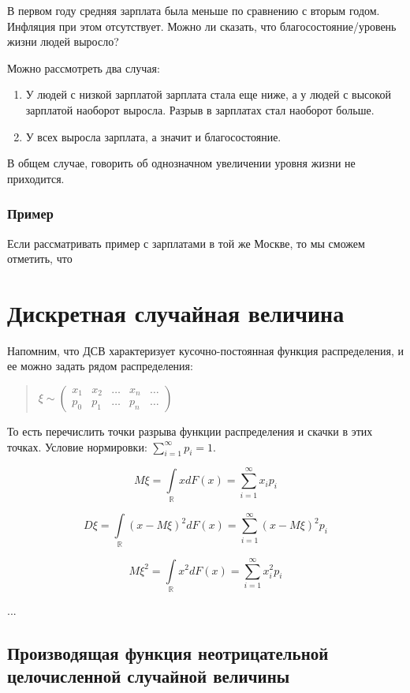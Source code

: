 \documentclass{article}
\begin{document}
В первом году средняя зарплата была меньше по сравнению с вторым годом. Инфляция при этом отсутствует. Можно ли сказать, что благосостояние/уровень жизни людей выросло?

Можно рассмотреть два случая:

\begin{enumerate}
\item У людей с низкой зарплатой зарплата стала еще ниже, а у людей с высокой зарплатой наоборот выросла. Разрыв в зарплатах стал наоборот больше.
\item У всех выросла зарплата, а значит и благосостояние.
\end{enumerate}

В общем случае, говорить об однозначном увеличении уровня жизни не приходится.

\subsubsection{Пример}

Если рассматривать пример с зарплатами в той же Москве, то мы сможем отметить, что 

\section{Дискретная случайная величина}

Напомним, что ДСВ характеризует кусочно-постоянная функция распределения, и ее можно задать рядом распределения:


\begin{quote}
$\xi \sim
\begin{pmatrix}
x_1 & x_2 & \ldots & x_n & \ldots\\
p_0 & p_1 & \ldots & p_n & \ldots
\end{pmatrix}$
\end{quote}


То есть перечислить точки разрыва функции распределения и скачки в этих точках. Условие нормировки: $\sum\limits_{i = 1}^\infty p_i = 1$.

$$M\xi = \int\limits_\mathbb{R} xdF(x) =
\sum\limits_{i = 1}^\infty x_i p_i$$

$$D\xi = \int\limits_\mathbb{R} (x - M\xi)^2 dF(x) =
\sum\limits_{i = 1}^\infty(x - M\xi)^2 p_i$$

$$M\xi^2 = \int\limits_\mathbb{R}x^2dF(x) = \sum\limits_{i = 1}^\infty x_i^2p_i$$

...

\subsection{Производящая функция неотрицательной целочисленной случайной величины}
\end{document}
